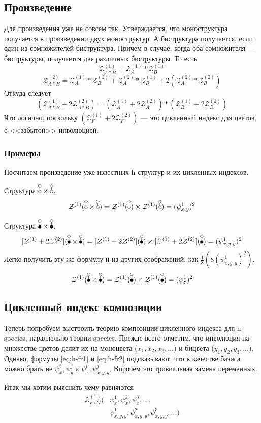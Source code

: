 \subsection{Произведение}
Для произведения уже не совсем так. Утверждается, что моноструктура получается
в произведении двух моноструктур. А биструктура получается, если один из
сомножителей биструктура. Причем в случае, когда оба сомножителя ---
биструктуры, получается две различных биструктуры. То есть
$$
\mathcal Z_{A * B}^{(1)} = \mathcal Z_A^{(1)} * \mathcal Z_B^{(1)}
$$
$$
\mathcal Z_{A * B}^{(2)} = 
\mathcal Z_A^{(1)} * \mathcal Z_B^{(2)} + 
\mathcal Z_A^{(2)} * \mathcal Z_B^{(1)} +
2 (\mathcal Z_A^{(2)} * \mathcal Z_B^{(2)})
$$
Откуда следует
$$
(\mathcal Z_{A * B}^{(1)} + 2\mathcal Z_{A * B}^{(2)}) = 
(\mathcal Z_A^{(1)} + 2\mathcal Z_A^{(2)}) * 
(\mathcal Z_B^{(1)} + 2\mathcal Z_B^{(2)})
 $$
Что логично, поскольку $(\mathcal Z_F^{(1)} + 2\mathcal Z_F^{(2)})$ --- это
цикленный индекс для цветов, с <<забытой>> инволюцией.

\subsubsection{Примеры}
Посчитаем произведение уже известных h-структур и их цикленных индексов.

Структура $\dA \times \dA$.
$$
\mathcal Z^{(1)}(\dA \times \dA) = \mathcal Z^{(1)}(\dA) \times \mathcal
Z^{(1)}(\dA) = (\psi_{x, y}^1)^2
$$

Структура $\dB \times \dB$.
$$
\Zfull(\dB \times \dB) = \Zfull(\dB) \times \Zfull(\dB) =(\psi_{x, y, y}^1)^2
$$
Легко получить эту же формулу и из других соображений, как
$\frac{1}{8}(8(\psi_{x, y, y}^1)^2)$.
$$
\mathcal Z^{(1)}(\dB \times \dB) = \mathcal Z^{(1)}(\dB) \times \mathcal
Z^{(1)}(\dB) =(\psi_{x}^1)^2
$$

\subsection{Цикленный индекс композиции}
Теперь попробуем выстроить теорию композиции цикленного индекса для h-species,
параллельно теории species. Прежде всего отметим, что инволюция на множестве
цветов делит их на моноцвета ($x_1, x_2, x_3, \dots$) и бицвета ($y_1, y_2,
y_3, \dots$). Однако, формулы \ref{eq:h-fr1} и \ref{eq:h-fr2} подсказывают, что
в качестве базиса можно брать не $\psi_x^i, \psi_y^j$ а $\psi_x^i, \psi_{x,y,y}^j$. Впрочем это
тривиальная замена переменных.

Итак мы хотим выяснить чему равняются
\begin{equation*}
\begin{split}
\mathcal Z^{(1)}_{F \circ G} (&\psi_x^1, \psi_x^2, \psi_x^3, \dots, \\
						&\psi_{x,y,y}^1, \psi_{x,y,y}^2, \psi_{x,y,y}^3, \dots)
\end{split}
\end{equation*}

